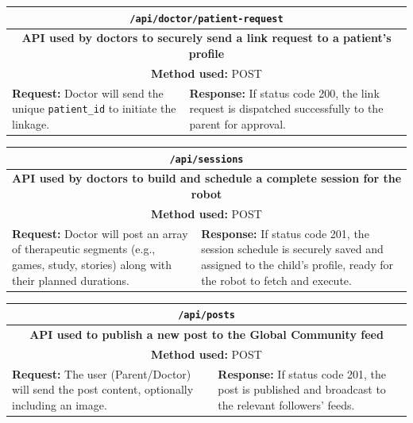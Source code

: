 \documentclass[12pt,a4paper]{report}
\begin{document}
\begin{table}[H]
    \centering
    \renewcommand{\arraystretch}{1.5}
    \begin{tabular}{|p{}|p{}|}
        \hline
        \multicolumn{2}{|c|}{\texttt{/api/doctor/patient-request}} \\
        \hline
        \multicolumn{2}{|c|}{\textbf{API used by doctors to securely send a link request to a patient's profile}} \\
        \hline
        \multicolumn{2}{|c|}{\textbf{Method used:} POST} \\
        \hline
        \textbf{Request:} Doctor will send the unique \texttt{patient\_id} to initiate the linkage. & 
        \textbf{Response:} If status code 200, the link request is dispatched successfully to the parent for approval. \\
        \hline
    \end{tabular}
\end{table}

\begin{table}[H]
    \centering
    \renewcommand{\arraystretch}{1.5}
    \begin{tabular}{|p{}|p{}|}
        \hline
        \multicolumn{2}{|c|}{\texttt{/api/sessions}} \\
        \hline
        \multicolumn{2}{|c|}{\textbf{API used by doctors to build and schedule a complete session for the robot}} \\
        \hline
        \multicolumn{2}{|c|}{\textbf{Method used:} POST} \\
        \hline
        \textbf{Request:} Doctor will post an array of therapeutic segments (e.g., games, study, stories) along with their planned durations. & 
        \textbf{Response:} If status code 201, the session schedule is securely saved and assigned to the child's profile, ready for the robot to fetch and execute. \\
        \hline
    \end{tabular}
\end{table}

\begin{table}[H]
    \centering
    \renewcommand{\arraystretch}{1.5}
    \begin{tabular}{|p{}|p{}|}
        \hline
        \multicolumn{2}{|c|}{\texttt{/api/posts}} \\
        \hline
        \multicolumn{2}{|c|}{\textbf{API used to publish a new post to the Global Community feed}} \\
        \hline
        \multicolumn{2}{|c|}{\textbf{Method used:} POST} \\
        \hline
        \textbf{Request:} The user (Parent/Doctor) will send the post content, optionally including an image. & 
        \textbf{Response:} If status code 201, the post is published and broadcast to the relevant followers' feeds. \\
        \hline
    \end{tabular}
\end{table}
\end{document}

